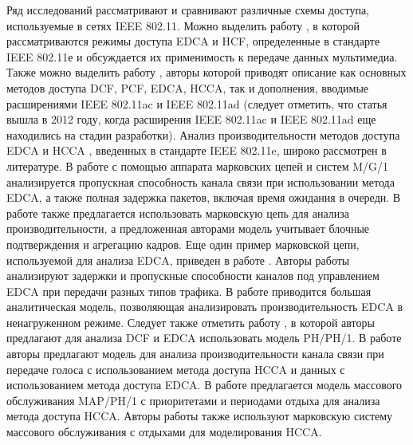 
Ряд исследований рассматривают и сравнивают различные схемы доступа, используемые в сетях IEEE 802.11. Можно выделить работу \cite{Gao2005}, в которой рассматриваются режимы доступа EDCA и HCF, определенные в стандарте IEEE 802.11е и обсуждается их применимость к передаче данных мультимедиа. Также можно выделить работу \cite{Charfi2012}, авторы которой приводят описание как основных методов доступа DCF, PCF, EDCA, HCCA, так и дополнения, вводимые расширениями IEEE 802.11ac и IEEE 802.11ad (следует отметить, что статья вышла в 2012 году, когда расширения IEEE 802.11ac и IEEE 802.11ad еще находились на стадии разработки). Анализ производительности методов доступа EDCA \cite{Engelstad2006, Hazra2011, Kong2004, Liu2007, Inan2009, Misic2012, YanfengZhu2006} и HCCA \cite{Harsha2006, Ghazizadeh2009, Rashd2006}, введенных в стандарте IEEE 802.11e, широко рассмотрен в литературе. В работе \cite{Engelstad2006} с помощью аппарата марковских цепей и систем M/G/1 анализируется пропускная способность канала связи при использовании метода EDCA, а также полная задержка пакетов, включая время ожидания в очереди. В работе \cite{Hazra2011} также предлагается использовать марковскую цепь для анализа производительности, а предложенная авторами модель учитывает блочные подтверждения и агрегацию кадров. Еще один пример марковской цепи, используемой для анализа EDCA, приведен в работе \cite{Kong2004}. Авторы работы \cite{Liu2007} анализируют задержки и пропускные способности каналов под управлением EDCA при передачи разных типов трафика. В работе \cite{Misic2012} приводится большая аналитическая модель, позволяющая анализировать производительность EDCA в ненагруженном режиме. Следует также отметить работу \cite{YanfengZhu2006}, в которой авторы предлагают для анализа DCF и EDCA использовать модель PH/PH/1. В работе \cite{Harsha2006} авторы предлагают модель для анализа производительности канала связи при передаче голоса с использованием метода доступа HCCA и данных с использованием метода доступа EDCA. В работе \cite{Ghazizadeh2009} предлагается модель массового обслуживания MAP/PH/1 с приоритетами и периодами отдыха для анализа метода доступа HCCA.  Авторы работы \cite{Rashd2006} также используют марковскую систему массового обслуживания с отдыхами для моделирования HCCA.


